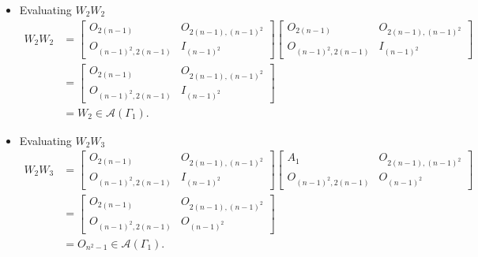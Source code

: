 \begin{itemize}
    \item Evaluating $W_2W_2$
    \begin{align*}
        W_2W_2
        &= \begin{bmatrix}
            O_{2(n-1)} & O_{2(n-1), (n-1)^2} \\
            O_{(n-1)^2, 2(n-1)} & I_{(n-1)^2}
        \end{bmatrix}\begin{bmatrix}
            O_{2(n-1)} & O_{2(n-1), (n-1)^2} \\
            O_{(n-1)^2, 2(n-1)} & I_{(n-1)^2}
        \end{bmatrix} \\
        &= \begin{bmatrix}
            O_{2(n-1)} & O_{2(n-1), (n-1)^2} \\
            O_{(n-1)^2, 2(n-1)} & I_{(n-1)^2}
        \end{bmatrix} \\
        &= W_2\in\mathcal{A}(\Gamma_1).
    \end{align*}
    
    \item Evaluating $W_2W_3$
    \begin{align*}
        W_2W_3
        &= \begin{bmatrix}
            O_{2(n-1)} & O_{2(n-1), (n-1)^2} \\
            O_{(n-1)^2, 2(n-1)} & I_{(n-1)^2}
        \end{bmatrix}\begin{bmatrix}
            A_1 & O_{2(n-1), (n-1)^2} \\
            O_{(n-1)^2, 2(n-1)} & O_{(n-1)^2}
        \end{bmatrix} \\
        &= \begin{bmatrix}
            O_{2(n-1)} & O_{2(n-1), (n-1)^2} \\
            O_{(n-1)^2, 2(n-1)} & O_{(n-1)^2}
        \end{bmatrix} \\
        &= O_{n^2-1}\in\mathcal{A}(\Gamma_1).
    \end{align*}
    

\end{itemize}
